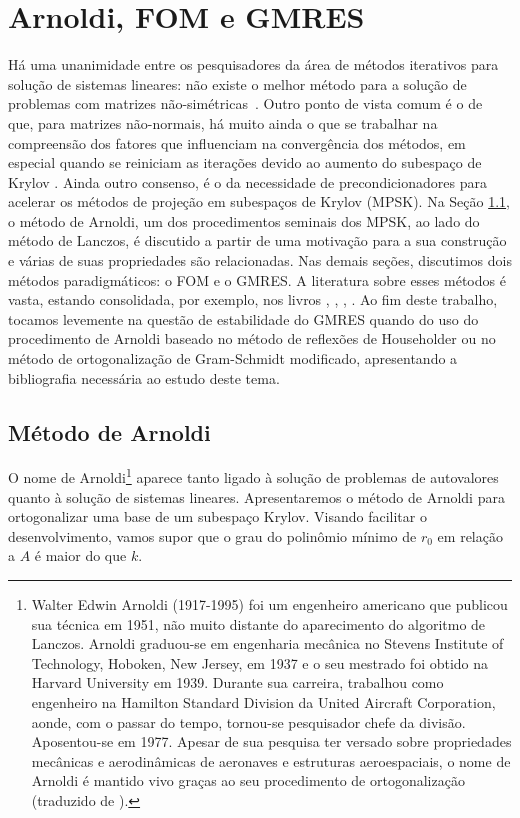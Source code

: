 
\chapter{Arnoldi, FOM e GMRES}
\label{chap:gmes}

Há uma unanimidade entre os pesquisadores da área de métodos iterativos para solução de sistemas lineares: não existe o melhor método para a solução de problemas com matrizes não-simétricas~\cite{NachtigalReddyEtAl1992How}. Outro ponto de vista comum é o de que, para matrizes não-normais, há muito ainda o  que se trabalhar na compreensão dos fatores que influenciam na convergência dos métodos, em especial quando se reiniciam as iterações devido ao aumento do subespaço de Krylov \cite{Meurant2024}. Ainda outro consenso, é o da necessidade de precondicionadores para acelerar os métodos de projeção em subespaços de Krylov (MPSK). Na Seção \ref{arnol_sec_arnol}, o método de Arnoldi,  um dos procedimentos seminais dos MPSK, ao lado do método de Lanczos, é discutido a partir de uma motivação para a sua construção e várias de suas propriedades são relacionadas. Nas demais seções, discutimos dois métodos paradigmáticos: o FOM e o GMRES. A literatura sobre esses métodos é vasta, estando consolidada, por exemplo, nos livros \cite{Brezinski2002Outils}, \cite{Greenbaum97Iterative}, \cite{Meurant2020Krylov} \cite{Saad03Iterative},  \cite{Vorst03Iterative}.  Ao fim deste trabalho, tocamos levemente na questão de estabilidade do GMRES quando do uso  do procedimento de Arnoldi baseado no método de reflexões de Householder ou no método de ortogonalização de Gram-Schmidt modificado,  apresentando a bibliografia necessária ao estudo deste tema. 

\section{Método de Arnoldi}\label{arnol_sec_arnol}
O nome de Arnoldi\footnote{Walter Edwin Arnoldi (1917-1995) foi um engenheiro americano que publicou sua técnica em 1951, não muito distante do aparecimento do algoritmo de Lanczos. Arnoldi graduou-se em engenharia mecânica no Stevens Institute of Technology, Hoboken, New
Jersey, em 1937 e o seu mestrado foi obtido na Harvard University em 1939. Durante sua carreira, trabalhou como engenheiro na Hamilton Standard Division da United Aircraft Corporation, aonde, com o passar do tempo, tornou-se pesquisador chefe da divisão. Aposentou-se em 1977. Apesar de sua pesquisa ter versado sobre propriedades mecânicas e aerodinâmicas de aeronaves e estruturas aeroespaciais, o nome de Arnoldi é mantido vivo graças ao seu procedimento de ortogonalização (traduzido de \cite{Meyer00Matrix}).} aparece tanto ligado à solução de problemas de autovalores quanto à solução de sistemas lineares.  Apresentaremos o método de Arnoldi \cite{Arnoldi51principle} para ortogonalizar uma base de um subespaço Krylov.
 Visando facilitar o desenvolvimento, vamos supor que o grau do polinômio mínimo  de $r_0$ em relação a $A$ é maior do que $k$.

